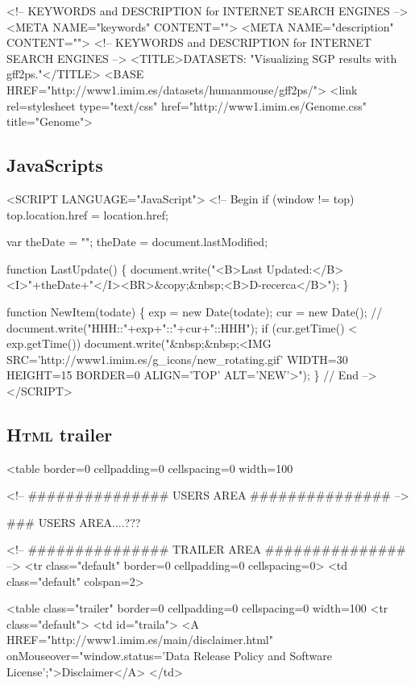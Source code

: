 \documentclass[11pt]{article}
\def\nwendcode{\endtrivlist \endgroup} %
\let\nwdocspar=\par                    %
\newcommand{\subsctn}[1]{\subsection{#1}}
\def\h{\textsc{Html}}
\begin{document}
\nwenddocs{}\endmoddef
 <!-- KEYWORDS and DESCRIPTION for INTERNET SEARCH ENGINES -->
  <META NAME="keywords"    CONTENT="">
  <META NAME="description" CONTENT="">
 <!-- KEYWORDS and DESCRIPTION for INTERNET SEARCH ENGINES -->
 <TITLE>DATASETS: "Visualizing SGP results with gff2ps."</TITLE>
 <BASE HREF="http://www1.imim.es/datasets/humanmouse/gff2ps/">
 <link rel=stylesheet type="text/css" href="http://www1.imim.es/Genome.css" title="Genome">
\nwendcode{}\nwdocspar

\subsctn{JavaScripts}

\nwenddocs{}\endmoddef
<SCRIPT LANGUAGE="JavaScript">
<!-- Begin
 if (window != top) top.location.href = location.href;

 var theDate = "";
 theDate = document.lastModified;

 function LastUpdate() \{
  document.write("<B>Last Updated:</B>  <I>"+theDate+"</I><BR>&copy;&nbsp;<B>D-recerca</B>");
 \}

 function NewItem(todate) \{
  exp = new Date(todate);
  cur = new Date();
  // document.write("HHH::"+exp+"::"+cur+"::HHH");
  if (cur.getTime() < exp.getTime())
   document.write("&nbsp;&nbsp;<IMG SRC='http://www1.imim.es/g_icons/new_rotating.gif' WIDTH=30 HEIGHT=15 BORDER=0 ALIGN='TOP' ALT='NEW'>");
 \}
// End -->
</SCRIPT>
\nwendcode{}\nwdocspar

\subsctn{{\h} trailer}

\nwenddocs{}\endmoddef
<table border=0 cellpadding=0 cellspacing=0 width=100%

<!-- ############### USERS AREA ############### -->

### USERS AREA....???

<!-- ############### TRAILER AREA ############### -->
<tr class="default" border=0 cellpadding=0 cellspacing=0>
<td class="default" colspan=2>

<table class="trailer" border=0 cellpadding=0 cellspacing=0 width=100%
<tr class="default">
<td id="traila">
<A HREF="http://www1.imim.es/main/disclaimer.html"
 onMouseover="window.status='Data Release Policy and Software License';">Disclaimer</A>
</td>
\end{document}
